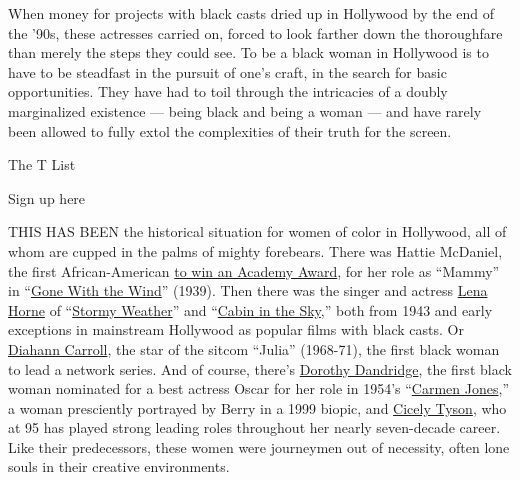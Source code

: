 When money for projects with black casts dried up in Hollywood by the
end of the '90s, these actresses carried on, forced to look farther down
the thoroughfare than merely the steps they could see. To be a black
woman in Hollywood is to have to be steadfast in the pursuit of one's
craft, in the search for basic opportunities. They have had to toil
through the intricacies of a doubly marginalized existence --- being
black and being a woman --- and have rarely been allowed to fully extol
the complexities of their truth for the screen.

The T List \textbar{}

Sign up here

THIS HAS BEEN the historical situation for women of color in Hollywood,
all of whom are cupped in the palms of mighty forebears. There was
Hattie McDaniel, the first African-American
\href{https://www.hollywoodreporter.com/features/oscars-first-black-winner-accepted-774335}{to
win an Academy Award}, for her role as ``Mammy'' in
``\href{https://www.nytimes.com/watching/titles/gone-with-the-wind}{Gone
With the Wind}'' (1939). Then there was the singer and actress
\href{https://www.nytimes.com/2010/05/10/arts/music/10horne.html}{Lena
Horne} of
``\href{https://www.nytimes.com/watching/titles/stormy-weather}{Stormy
Weather}'' and
``\href{https://www.nytimes.com/watching/titles/movies/1000118508}{Cabin
in the Sky},'' both from 1943 and early exceptions in mainstream
Hollywood as popular films with black casts. Or
\href{https://www.nytimes.com/2019/10/04/arts/television/diahann-carroll-dead.html}{Diahann
Carroll}, the star of the sitcom ``Julia'' (1968-71), the first black
woman to lead a network series. And of course, there's
\href{https://www.nytimes.com/1965/09/09/archives/dorothy-dandridge-found-dead-a-t-her-apartment-in-hollywood-singer.html}{Dorothy
Dandridge}, the first black woman nominated for a best actress Oscar for
her role in 1954's
``\href{https://www.nytimes.com/watching/titles/movies/1000018520}{Carmen
Jones},'' a woman presciently portrayed by Berry in a 1999 biopic, and
\href{https://www.nytimes.com/2013/09/29/fashion/for-cicely-tyson-and-kerry-washington-roles-of-a-lifetime.html}{Cicely
Tyson}, who at 95 has played strong leading roles throughout her nearly
seven-decade career. Like their predecessors, these women were
journeymen out of necessity, often lone souls in their creative
environments.

